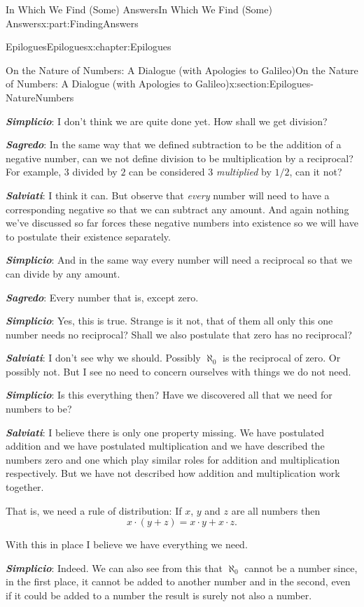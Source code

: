 \documentclass[oneside,10pt,]{book}
\newcommand{\alert}[1]{\textbf{\textit{#1}}}
\numberwithin{equation}{section}
\begin{document}
\begin{partptx}{In Which We Find (Some) Answers}{}{In Which We Find (Some) Answers}{}{}{x:part:FindingAnswers}
\begin{chapterptx}{Epilogues}{}{Epilogues}{}{}{x:chapter:Epilogues}
\begin{sectionptx}{On the Nature of Numbers: A Dialogue (with Apologies to Galileo)}{}{On the Nature of Numbers: A Dialogue (with Apologies to Galileo)}{}{}{x:section:Epilogues-NatureNumbers}
\begin{introduction}{}
\alert{Simplicio}:  I don't think we are quite done yet. How shall we get division?%
\par
\alert{Sagredo}:  In the same way that we defined subtraction to be the addition of a negative number, can we not define division to be multiplication by a reciprocal? For example, \(3\) divided by \(2\) can be considered \(3\) \emph{multiplied} by \(1/2\), can it not?%
\par
\alert{Salviati}:  I think it can. But observe that \emph{every} number will need to have a corresponding negative so that we can subtract any amount. And again nothing we've discussed so far forces these negative numbers into existence so we will have to postulate their existence separately.%
\par
\alert{Simplicio}:  And in the same way every number will need a reciprocal so that we can divide by any amount.%
\par
\alert{Sagredo}:  Every number that is, except zero.%
\par
\alert{Simplicio}:  Yes, this is true. Strange is it not, that of them all only this one number needs no reciprocal? Shall we also postulate that zero has no reciprocal?%
\par
\alert{Salviati}: I don't see why we should. Possibly \(\aleph_0\) is the reciprocal of zero. Or possibly not. But I see no need to concern ourselves with things we do not need.%
\par
\alert{Simplicio}: Is this everything then? Have we discovered all that we need for numbers to be?%
\par
\alert{Salviati}: I believe there is only one property missing. We have postulated addition and we have postulated multiplication and we have described the numbers zero and one which play similar roles for addition and multiplication respectively. But we have not described how addition and multiplication work together.%
\par
That is, we need a rule of distribution:  If \(x\), \(y\) and \(z\) are all numbers then%
\begin{equation*}
x\cdot(y+z) = x\cdot y+x\cdot z\text{.}
\end{equation*}
%
\par
With this in place I believe we have everything we need.%
\par
\alert{Simplicio}:  Indeed. We can also see from this that \(\aleph_0\) cannot be a number since, in the first place, it cannot be added to another number and in the second, even if it could be added to a number the result is surely not also a number.%

\end{introduction}
\end{sectionptx}
\end{chapterptx}
\end{partptx}
\end{document}
